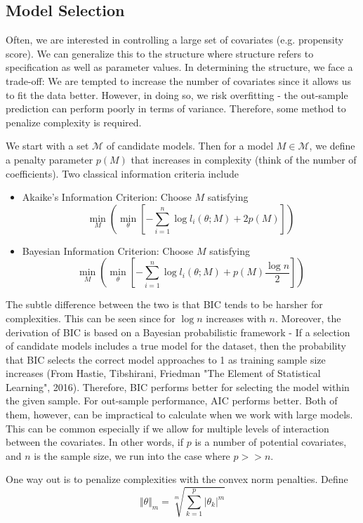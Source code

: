 \documentclass[12pt]{article}
\theoremstyle{definition}
\theoremstyle{property}
\theoremstyle{assumption}
\theoremstyle{example}
\theoremstyle{comment}
\begin{document}
\subsection{Model Selection}
Often, we are interested in controlling a large set of covariates (e.g. propensity score). We can generalize this to the structure where structure refers to specification as well as parameter values. In determining the structure, we face a trade-off: We are tempted to increase the number of covariates since it allows us to fit the data better. However, in doing so, we risk overfitting - the out-sample prediction can perform poorly in terms of variance. Therefore, some method to penalize complexity is required. 
\par
We start with a set $\mathcal{M}$ of candidate models. Then for a model $M\in\mathcal{M}$, we define a penalty parameter $p(M)$ that increases in complexity (think of the number of coefficients). Two classical information criteria include
\begin{itemize}
\item Akaike's Information Criterion: Choose $M$ satisfying
\[
\min_{M}\left(\min_\theta\left[ -\sum_{i=1}^n \log{l_i(\theta;M)}+2p(M) \right]\right)
\]
\item Bayesian Information Criterion: Choose $M$ satisfying
\[
\min_{M}\left(\min_\theta\left[ -\sum_{i=1}^n \log{l_i(\theta;M)}+p(M)\frac{\log{n}}{2} \right]\right)
\]
\end{itemize}
The subtle difference between the two is that BIC tends to be harsher for complexities. This can be seen since for $\log{n}$ increases with $n$. Moreover, the derivation of BIC is based on a Bayesian probabilistic framework - If a selection of candidate models includes a true model for the dataset, then the probability that BIC selects the correct model approaches to 1 as training sample size increases (From Hastie, Tibshirani, Friedman "The Element of Statistical Learning", 2016). Therefore, BIC performs better for selecting the model within the given sample. For out-sample performance, AIC performs better. Both of them, however, can be impractical to calculate when we work with large models. This can be common especially if we allow for multiple levels of interaction between the covariates. In other words, if $p$ is a number of potential covariates, and $n$ is the sample size, we run into the case where $p>>n$. \par
One way out is to penalize complexities with the convex norm penalties. Define
\[
\Vert \theta \Vert _m = \sqrt[m]{\sum_{k=1}^p \vert \theta_k \vert ^m}
\]
\end{document}

